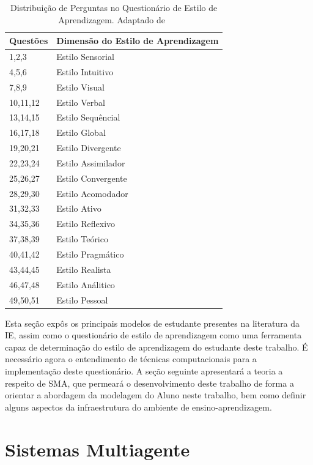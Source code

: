 \begin{table}
	\caption{Distribuição de Perguntas no Questionário de Estilo de Aprendizagem. Adaptado de~\cite{muhlbeier12}}
	\centering
	\begin{tabular}{|p{4cm} | p{8cm} |}
		\hline
		\textbf{Questões}	& \textbf{Dimensão do Estilo de Aprendizagem}	\\
		\hline
		1,2,3	&  Estilo Sensorial	\\
		\hline
		4,5,6	&  Estilo Intuitivo	\\
		\hline
		7,8,9	&  Estilo Visual	\\
		\hline
		10,11,12	&  Estilo Verbal	\\
		\hline
		13,14,15	&  Estilo Sequêncial	\\
		\hline
		16,17,18	&  Estilo Global	\\
		\hline
		19,20,21	&  Estilo Divergente	\\
		\hline
		22,23,24	&  Estilo Assimilador	\\
		\hline
		25,26,27	&  Estilo Convergente	\\
		\hline
		28,29,30	&  Estilo Acomodador	\\
		\hline
		31,32,33	&  Estilo Ativo	\\
		\hline
		34,35,36	&  Estilo Reflexivo	\\
		\hline
		37,38,39	&  Estilo Teórico	\\
		\hline
		40,41,42	&  Estilo Pragmático	\\
		\hline
		43,44,45	&  Estilo Realista	\\
		\hline
		46,47,48	&  Estilo Análitico	\\
		\hline
		49,50,51	&  Estilo Pessoal	\\
		\hline
	\end{tabular}
	\label{questionario_ie}
\end{table}

Esta seção expôs os principais modelos de estudante presentes na literatura da IE, assim como o questionário de estilo de aprendizagem como uma ferramenta capaz de determinação do estilo de aprendizagem do estudante deste trabalho. É necessário agora o entendimento de técnicas computacionais para a implementação deste questionário. A seção seguinte apresentará a teoria a respeito de SMA, que permeará o desenvolvimento deste trabalho de forma a orientar a abordagem da modelagem do Aluno neste trabalho, bem como definir alguns aspectos da infraestrutura do ambiente de ensino-aprendizagem.

\section{Sistemas Multiagente}\label{section:sma}

